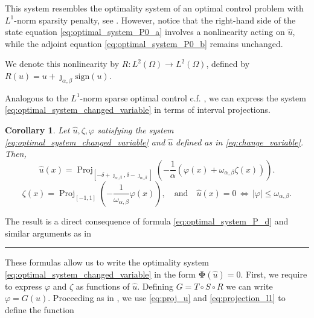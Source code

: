 \documentclass[11pt,a4paper]{amsart}
\newcommand{\kw}{\rule{2mm}{2mm}}
\renewcommand{\l}{\left}
\renewcommand{\r}{\right}
\newcommand{\om}{\Omega}
\newcommand{\sign}{\mathrm{sign}}
\DeclareMathOperator{\proj}{Proj}
\renewenvironment{proof}{{Proof.}}{\hfill\kw}
\newtheorem{corollary}{{Corollary}}
\begin{document}
This system resembles the optimality system of an optimal control problem with $L^1$-norm sparsity penalty, see \cite{CasasMateos2024}.  However, notice that the right-hand side of the state equation \eqref{eq:optimal_system_P0_a} involves a nonlinearity acting on $\hat 
u$, while the adjoint equation \eqref{eq:optimal_system_P0_b} remains unchanged. 

We denote this nonlinearity  by $R:L^2(\om) \to L^2(\om)$, defined by $R(u)=u+\jmath_{\alpha,\beta}\sign(u)$.

Analogous to the $L^1$-norm sparse optimal control c.f. \cite{CasasMateos2024}, we can express the system \eqref{eq:optimal_system_changed_variable} in terms of interval projections. 

\begin{corollary}
    Let $\hat u, \zeta, \varphi$ satisfying the system \eqref{eq:optimal_system_changed_variable} and $\hat u$ defined as in \eqref{eq:change_variable}. Then,
    \begin{equation}\label{eq:proj_u}
     \hat u(x)=\proj_{[-\delta+\jmath_{\alpha,\beta}, \delta-\jmath_{\alpha, \beta}]}\l(-\frac{1}{\alpha}\l(\varphi(x)+\omega_{\alpha,\beta}\zeta(x)\r)\r).   
    \end{equation}
    \begin{equation}\label{eq:projection_l1}
        \zeta(x) = \proj_{[-1,1]}\l(-\frac{1}{\omega_{\alpha,\beta}}\varphi(x)\r), \quad \text{and}\quad \hat u(x)=0\, \Longleftrightarrow \, |\varphi|\leq \omega_{\alpha,\beta}.
    \end{equation}
\end{corollary}



\begin{proof}
    The result is a direct consequence of formula \eqref{eq:optimal_system_P_d} and similar arguments as in \cite[Theorem 3.2]{casas2012}
\end{proof}

These formulas allow us to write the optimality system \eqref{eq:optimal_system_changed_variable} in the form $\mathbf{\Phi}(\hat u) =0$. First, we require to express $\varphi$ and $\zeta$ as functions of $\hat u$. Defining $G = T \circ S \circ R$  we can write $\varphi = G(u)$. Proceeding as in \cite{CasasMateos2024}, we use \eqref{eq:proj_u} and \eqref{eq:projection_l1} to define the function
\end{document}
